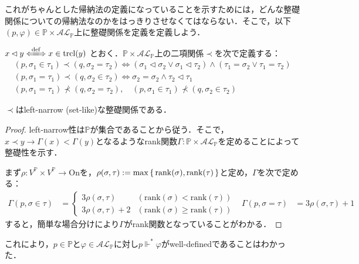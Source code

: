 \documentclass[a4j]{bxjsarticle}
\theoremstyle{definition}
\newcommand{\rank}{\mathrm{rank}}
\begin{document}
これがちゃんとした帰納法の定義になっていることを示すためには，どんな整礎関係についての帰納法なのかをはっきりさせなくてはならない．そこで，以下$(p, \varphi) \in \mathbb{P} \times \mathcal{AL}_\mathbb{P}$上に整礎関係を定義を定義しよう．

\begin{definition}
 $x \lhd y \defs x \in \mathrm{trcl}(y)$ とおく．$\mathbb{P} \times \mathcal{AL}_\mathbb{P}$上の二項関係$\prec$を次で定義する：
 \begin{gather*}
  (p, \sigma_1 \in \tau_1) \prec (q, \sigma_2 = \tau_2) \Leftrightarrow (\sigma_1 \lhd \sigma_2 \vee \sigma_1 \lhd \tau_2) \wedge (\tau_1 = \sigma_2 \vee \tau_1 = \tau_2)\\
  (p, \sigma_1 = \tau_1) \prec (q, \sigma_2 \in \tau_2) \Leftrightarrow \sigma_2 = \sigma_2 \wedge \tau_2 \lhd \tau_1\\
  (p, \sigma_1 = \tau_1) \not\prec (q, \sigma_2 = \tau_2), \quad
  (p, \sigma_1 \in \tau_1) \not\prec (q, \sigma_2 \in \tau_2) 
 \end{gather*}
\end{definition}

\begin{claim}
 $\prec$はleft-narrow (set-like)な整礎関係である．
\end{claim}
\begin{proof}
 left-narrow性は$\mathbb{P}$が集合であることから従う．そこで，$x \prec y \rightarrow \Gamma(x) < \Gamma(y)$となるようなrank関数$\Gamma : \mathbb{P} \times \mathcal{AL}_\mathbb{P}$を定めることによって整礎性を示す．

 まず$\rho: V^\mathbb{P}\times V^\mathbb{P}\rightarrow \mathrm{On}$を，$\rho(\sigma, \tau) \defeq  \max\set{\rank(\sigma),\rank(\tau)}$と定め，$\Gamma$を次で定める：
 \begin{align*}
  \Gamma(p, \sigma \in \tau) &= \begin{cases}
				 3 \rho(\sigma, \tau) & (\rank(\sigma) < \rank(\tau))\\
				 3 \rho(\sigma, \tau) + 2 & (\rank(\sigma) \geq \rank(\tau))				 
				\end{cases} &
  \Gamma(p, \sigma = \tau) &= 3 \rho(\sigma, \tau) + 1
 \end{align*}
 すると，簡単な場合分けにより$\Gamma$がrank関数となっていることがわかる．\mbox{}
\end{proof}

これにより，$p \in \mathbb{P}$と$\varphi \in \mathcal{AL}_\mathbb{P}$に対し$p \mathrel{\Vdash^*} \varphi$がwell-definedであることはわかった．
\end{document}
